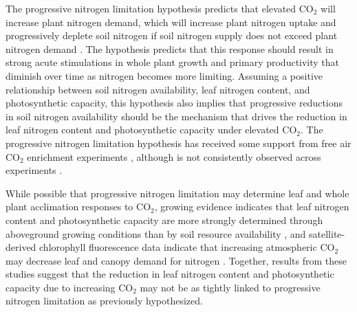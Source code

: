 The progressive nitrogen limitation hypothesis predicts that elevated CO$_2$ will increase plant nitrogen demand, which will increase plant nitrogen uptake and progressively deplete soil nitrogen if soil nitrogen supply does not exceed plant nitrogen demand . The hypothesis predicts that this response should result in strong acute stimulations in whole plant growth and primary productivity that diminish over time as nitrogen becomes more limiting. Assuming a positive relationship between soil nitrogen availability, leaf nitrogen content, and photosynthetic capacity, this hypothesis also implies that progressive reductions in soil nitrogen availability should be the mechanism that drives the reduction in leaf nitrogen content and photosynthetic capacity under elevated CO$_2$. The progressive nitrogen limitation hypothesis has received some support from free air CO$_2$ enrichment experiments , although is not consistently observed across experiments .

While possible that progressive nitrogen limitation may determine leaf and whole plant acclimation responses to CO$_2$, growing evidence indicates that leaf nitrogen content and photosynthetic capacity are more strongly determined through aboveground growing conditions than by soil resource availability , and satellite-derived chlorophyll fluorescence data indicate that increasing atmospheric CO$_2$ may decrease leaf and canopy demand for nitrogen . Together, results from these studies suggest that the reduction in leaf nitrogen content and photosynthetic capacity due to increasing CO$_2$ may not be as tightly linked to progressive nitrogen limitation as previously hypothesized.

